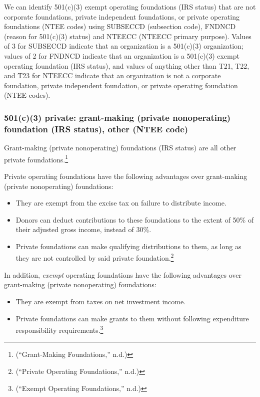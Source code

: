 \documentclass[
  letterpaper,
  DIV=11,
  numbers=noendperiod,
  oneside]{scrreprt}
\providecommand{\tightlist}{%
  \setlength{\itemsep}{0pt}\setlength{\parskip}{0pt}}\usepackage{longtable,booktabs,array}
\begin{document}
We can identify 501(c)(3) exempt operating foundations (IRS status) that
are not corporate foundations, private independent foundations, or
private operating foundations (NTEE codes) using SUBSECCD (subsection
code), FNDNCD (reason for 501(c)(3) status) and NTEECC (NTEECC primary
purpose). Values of 3 for SUBSECCD indicate that an organization is a
501(c)(3) organization; values of 2 for FNDNCD indicate that an
organization is a 501(c)(3) exempt operating foundation (IRS status),
and values of anything other than T21, T22, and T23 for NTEECC indicate
that an organization is not a corporate foundation, private independent
foundation, or private operating foundation (NTEE codes).

\hypertarget{c3-private-grant-making-private-nonoperating-foundation-irs-status-other-ntee-code}{%
\subsubsection{501(c)(3) private: grant-making (private nonoperating)
foundation (IRS status), other (NTEE
code)}\label{c3-private-grant-making-private-nonoperating-foundation-irs-status-other-ntee-code}}

Grant-making (private nonoperating) foundations (IRS status) are all
other private foundations.\footnote{({``Grant-Making Foundations,''}
  n.d.)}

Private operating foundations have the following advantages over
grant-making (private nonoperating) foundations:

\begin{itemize}
\tightlist
\item
  They are exempt from the excise tax on failure to distribute income.
\item
  Donors can deduct contributions to these foundations to the extent of
  50\% of their adjusted gross income, instead of 30\%.
\item
  Private foundations can make qualifying distributions to them, as long
  as they are not controlled by said private foundation.\footnote{({``Private
    Operating Foundations,''} n.d.)}
\end{itemize}

In addition, \emph{exempt} operating foundations have the following
advantages over grant-making (private nonoperating) foundations:

\begin{itemize}
\tightlist
\item
  They are exempt from taxes on net investment income.
\item
  Private foundations can make grants to them without following
  expenditure responsibility requirements.\footnote{({``Exempt Operating
    Foundations,''} n.d.)}
\end{itemize}
\end{document}
